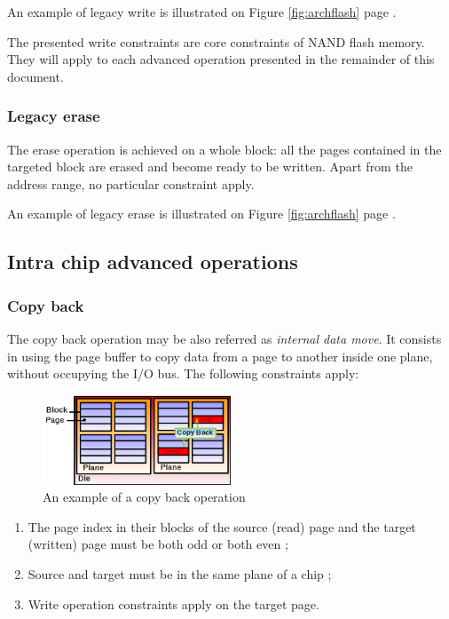 An example of legacy write is illustrated on Figure \ref{fig:archflash} page \pageref{fig:archflash}.

The presented write constraints are core constraints of NAND flash memory. They will apply to each advanced operation presented in the remainder of this document.

\subsubsection{Legacy erase}
The erase operation is achieved on a whole block: all the pages contained in the targeted block are erased and become ready to be written. Apart from the address range, no particular constraint apply.

An example of legacy erase is illustrated on Figure \ref{fig:archflash} page \pageref{fig:archflash}.

\subsection{Intra chip advanced operations}

\subsubsection{Copy back}

The copy back operation may be also referred as \emph{internal data move}. It consists in using the page buffer to copy data from a page to another inside one plane, without occupying the I/O bus. The following constraints apply:

\begin{figure}
  \center
  \includegraphics[width=0.5\textwidth]{Includes/CopyBack.png}
  \caption{An example of a copy back operation}
  \label{fig:copyback}
\end{figure}

\begin{enumerate}
  \item The page index in their blocks of the source (read) page and the target (written) page must be both odd or both even ;
  \item Source and target must be in the same plane of a chip ;
  \item Write operation constraints apply on the target page.
\end{enumerate}

